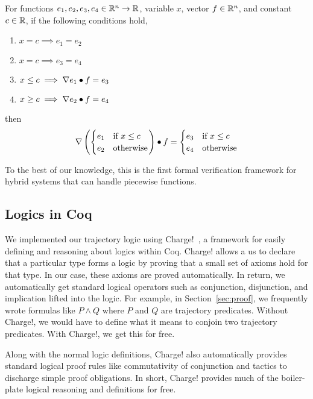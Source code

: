 \begin{lemma}
For functions $e_1, e_2, e_3, e_4 \in \mathbb{R}^n \rightarrow \mathbb{R}$, variable $x$,
vector $f \in \mathbb{R}^n$, and constant $c \in \mathbb{R}$, if the following conditions
hold,
\begin{enumerate}[label=\roman*), ref=\roman*]
\item $x = c \implies e_1 = e_2$
\item $x = c \implies e_3 = e_4$
\item $x \leq c \implies \nabla e_1 \bullet f = e_3$
\item $x \geq c \implies \nabla e_2 \bullet f = e_4$
\end{enumerate}
then
\[
\nabla \left(
\begin{cases}
e_1 & \text{if } x \leq c \\
e_2 & \text{otherwise}
\end{cases}
\right)
\bullet
f
=
\begin{cases}
e_3 & \text{if } x \leq c \\
e_4 & \text{otherwise}
\end{cases}
\]
\label{lem:pw-deriv}
\end{lemma}

To the best of our knowledge, this is the first formal verification
framework for hybrid systems that can handle piecewise functions.

\subsection{Logics in Coq}
We implemented our trajectory logic using Charge!~\cite{chargecoregit}, a
framework for easily defining and reasoning about logics within
Coq. Charge! allows a us to declare that a particular type forms a logic by
proving that a small set of axioms hold for that type. In our case, these
axioms are proved automatically. In return, we automatically get standard
logical operators such as conjunction, disjunction, and implication lifted
into the logic. For example, in Section~\ref{sec:proof}, we frequently
wrote formulas like $P \wedge Q$ where $P$ and $Q$ are trajectory
predicates. Without Charge!, we would have to define what it means to
conjoin two trajectory predicates. With Charge!, we get this for free.

Along with the normal logic definitions, Charge! also automatically
provides standard logical proof rules like commutativity of conjunction and
tactics to discharge simple proof obligations. In short, Charge! provides
much of the boiler-plate logical reasoning and definitions for free.

